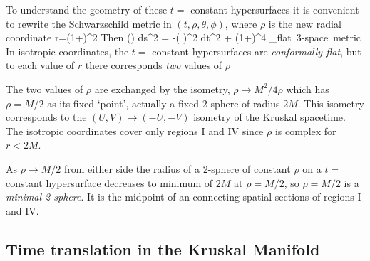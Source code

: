 To understand the geometry of these $t=$ constant hypersurfaces it is 
convenient to rewrite the Schwarzschild metric in 
$(t,\rho,\theta,\phi)$, where $\rho$ is the new radial coordinate
\be
r=\left(1+\right)^2\rho
\ee
Then ()
\be
ds^2 = -\left(  
\right)^2 dt^2 + \left(1+\right)^4 _{\mbox{flat 3-space metric}} 
\ee
In isotropic coordinates, the $t=$ constant hypersurfaces are 
\emph{conformally flat}, but to each value of $r$ there corresponds \emph{two}
values of $\rho$
\begin{center}\end{center}
The two values of $\rho$ are exchanged by the isometry, $\rho\to M^2/4\rho$ 
which has $\rho=M/2$ as its fixed `point', actually a fixed 2-sphere of radius
$2M$.  This isometry corresponds to the $(U,V)\to (-U,-V)$ isometry of the
Kruskal spacetime.  The isotropic coordinates cover only regions I and IV since
$\rho$ is complex for $r<2M$.
\begin{center}\end{center}
As $\rho\to M/2$ from either side the radius of a 2-sphere of constant 
$\rho$ on a $t=$ constant hypersurface decreases to minimum of $2M$ at
$\rho=M/2$, so $\rho=M/2$ is a \emph{minimal 2-sphere}.  It is the midpoint of
an  connecting spatial sections of regions I and
IV.  
\begin{center}\end{center}

\subsection{Time translation in the Kruskal Manifold}

